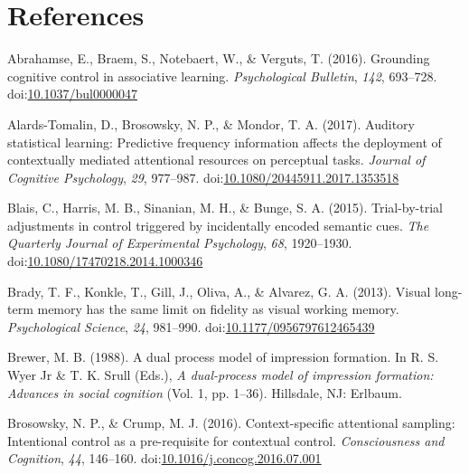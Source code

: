 \documentclass[english,,man,floatsintext]{apa6}
\begin{document}
\hypertarget{references}{%
\section{References}\label{references}}

\begingroup
\setlength{\parindent}{-0.5in}
\setlength{\leftskip}{0.5in}

\hypertarget{refs}{}
\leavevmode\hypertarget{ref-abrahamse_grounding_2016}{}%
Abrahamse, E., Braem, S., Notebaert, W., \& Verguts, T. (2016). Grounding cognitive control in associative learning. \emph{Psychological Bulletin}, \emph{142}, 693--728. doi:\href{https://doi.org/10.1037/bul0000047}{10.1037/bul0000047}

\leavevmode\hypertarget{ref-alards-tomalin_auditory_2017}{}%
Alards-Tomalin, D., Brosowsky, N. P., \& Mondor, T. A. (2017). Auditory statistical learning: Predictive frequency information affects the deployment of contextually mediated attentional resources on perceptual tasks. \emph{Journal of Cognitive Psychology}, \emph{29}, 977--987. doi:\href{https://doi.org/10.1080/20445911.2017.1353518}{10.1080/20445911.2017.1353518}

\leavevmode\hypertarget{ref-blais_trial-by-trial_2015}{}%
Blais, C., Harris, M. B., Sinanian, M. H., \& Bunge, S. A. (2015). Trial-by-trial adjustments in control triggered by incidentally encoded semantic cues. \emph{The Quarterly Journal of Experimental Psychology}, \emph{68}, 1920--1930. doi:\href{https://doi.org/10.1080/17470218.2014.1000346}{10.1080/17470218.2014.1000346}

\leavevmode\hypertarget{ref-brady_visual_2013}{}%
Brady, T. F., Konkle, T., Gill, J., Oliva, A., \& Alvarez, G. A. (2013). Visual long-term memory has the same limit on fidelity as visual working memory. \emph{Psychological Science}, \emph{24}, 981--990. doi:\href{https://doi.org/10.1177/0956797612465439}{10.1177/0956797612465439}

\leavevmode\hypertarget{ref-brewer_dual_1988}{}%
Brewer, M. B. (1988). A dual process model of impression formation. In R. S. Wyer Jr \& T. K. Srull (Eds.), \emph{A dual-process model of impression formation: Advances in social cognition} (Vol. 1, pp. 1--36). Hillsdale, NJ: Erlbaum.

\leavevmode\hypertarget{ref-brosowsky_context-specific_2016}{}%
Brosowsky, N. P., \& Crump, M. J. (2016). Context-specific attentional sampling: Intentional control as a pre-requisite for contextual control. \emph{Consciousness and Cognition}, \emph{44}, 146--160. doi:\href{https://doi.org/10.1016/j.concog.2016.07.001}{10.1016/j.concog.2016.07.001}
\end{document}
